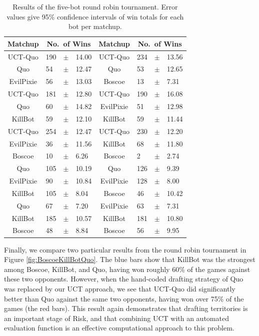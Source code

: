 \documentclass[letterpaper]{article}
\numberwithin{equation}{section}
\numberwithin{theorem}{section}
\numberwithin{lemma}{section}
\numberwithin{df}{section}
\begin{document}
\begin{table}[t]
	\centering
		\caption{Results of the five-bot round robin tournament.  Error values give 95\% confidence intervals of win totals for each bot per matchup.} 
		\label{tab:roundRobin}
		\begin{tabular}{|cp{10pt}p{5pt}p{18pt}|cp{10pt}p{5pt}p{18pt}|}
			\hline
			\textbf{Matchup} & \multicolumn{3}{c|}{\textbf{No.~of Wins}} & \textbf{Matchup} & \multicolumn{3}{c|}{\textbf{No.~of Wins}} \\
			\hline
			UCT-Quo & 190 & $\pm$ & 14.00 & 	UCT-Quo & 234 & $\pm$ & 13.56 \\   
			Quo & 54 & $\pm$ & 12.47 & 				Quo &  53 & $\pm$ & 12.65 \\
			EvilPixie & 56 & $\pm$ & 13.03 & 	Boscoe & 13 & $\pm$ & 7.31 \\  
			\hline
			UCT-Quo & 181 & $\pm$ & 12.80 & 	UCT-Quo & 190 & $\pm$ & 16.08\\
			Quo & 60 & $\pm$ & 14.82 & 				EvilPixie &  51 & $\pm$ & 12.98\\
			KillBot & 59 & $\pm$ & 12.10 & 		KillBot &  59 & $\pm$ & 11.44\\
			\hline
			UCT-Quo & 254 & $\pm$ & 12.47 & 	UCT-Quo & 230 & $\pm$ & 12.20\\
			EvilPixie & 36 & $\pm$ & 11.56 & 	KillBot &  68 & $\pm$ & 11.80\\
			Boscoe & 10 & $\pm$ & 6.26 & 			Boscoe &  2 & $\pm$ & 2.74\\
			\hline
			Quo & 105 & $\pm$ & 10.19 & 			Quo & 126 & $\pm$ & 9.39 \\
			EvilPixie & 90 & $\pm$ & 10.84 & 	EvilPixie &  128 & $\pm$ & 8.00 \\
			KillBot & 105 & $\pm$ & 8.04 & 		Boscoe &  46 & $\pm$ & 10.42 \\
			\hline
			Quo & 67 & $\pm$ & 7.20 & 				EvilPixie & 63 & $\pm$ & 7.31 \\
			KillBot & 185 & $\pm$ & 10.57 & 	KillBot &  181 & $\pm$ & 10.80 \\
			Boscoe & 48 & $\pm$ & 8.84 & 			Boscoe &  56 & $\pm$ & 9.95 \\
			\hline
		\end{tabular}
	
\end{table}

Finally, we compare two particular results from the round robin tournament in Figure \ref{fig:BoscoeKillBotQuo}.  The blue bars show that KillBot was the strongest among Boscoe, KillBot, and Quo, having won roughly 60\% of the games against these two opponents.  However, when the hand-coded drafting strategy of Quo was replaced by our UCT approach, we see that UCT-Quo did significantly better than Quo against the same two opponents, having won over 75\% of the games (the red bars).  This result again demonstrates that drafting territories is an important stage of Risk, and that combining UCT with an automated evaluation function is an effective computational approach to this problem.
\end{document}
